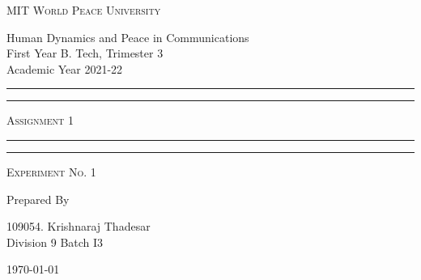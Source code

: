 \documentclass[11pt]{article}
\begin{document}
	
	\begin{titlepage} 
		\centering 
		
		
		\huge\textsc{
			MIT World Peace University
		}\\
	
		\vspace{0.75\baselineskip} %
		
		\LARGE{
			Human Dynamics and Peace in Communications\\
			First Year B. Tech, Trimester 3\\
			Academic Year 2021-22
		}
		
		\vfill %
		
		
		\rule{\textwidth}{1.6pt}\vspace*{-\baselineskip}\vspace*{2pt}
		\rule{\textwidth}{0.6pt}
		\vspace{0.75\baselineskip} %
		
		
		
		\huge{\textsc{
				Assignment 1
			}} \\
		
		
		
		\vspace{0.5\baselineskip} %
		\rule{\textwidth}{0.6pt}\vspace*{-\baselineskip}\vspace*{2.8pt}
		\rule{\textwidth}{1.6pt}
		
		\vspace{1\baselineskip} %

			
		\LARGE\textsc{
			Experiment No. 1
		} %
		\vfill
		
		
		Prepared By
		\vspace{0.5\baselineskip} %
		
		\Large{
			109054. Krishnaraj Thadesar\\
						
			Division 9 Batch I3
		}
		
		
		\vspace{0.5\baselineskip} %
		\today

	\end{titlepage}
	
\end{document}
